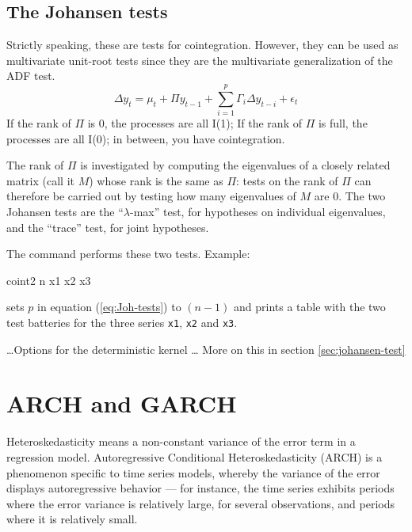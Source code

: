 \subsection{The Johansen tests}
\label{sec:Joh-test}

Strictly speaking, these are tests for cointegration. However, they
can be used as multivariate unit-root tests since they are the
multivariate generalization of the ADF test.
\begin{equation}
  \label{eq:Joh-tests}
  \Delta y_t = \mu_t + \Pi y_{t-1} + \sum_{i=1}^p \Gamma_i \Delta
  y_{t-i} + \epsilon_t
\end{equation}
If the rank of $\Pi$ is 0, the processes are all I(1); If the rank of
$\Pi$ is full, the processes are all I(0); in between, you have
cointegration.

The rank of $\Pi$ is investigated by computing the eigenvalues of a
closely related matrix (call it $M$) whose rank is the same as $\Pi$:
tests on the rank of $\Pi$ can therefore be carried out by testing how
many eigenvalues of $M$ are 0. The two Johansen tests are the
``$\lambda$-max'' test, for hypotheses on individual eigenvalues, and
the ``trace'' test, for joint hypotheses.

The  command  performs these two tests.
Example:
\begin{code}
  coint2 n x1 x2 x3
\end{code}
sets $p$ in equation (\ref{eq:Joh-tests}) to $(n-1)$ and prints a table
with the two test batteries for the three series \verb|x1|, \verb|x2|
and \verb|x3|.
 
\ldots Options for the deterministic kernel \ldots
More on this in section \ref{sec:johansen-test}

\section{ARCH and GARCH}
\label{sec:arch}

Heteroskedasticity means a non-constant variance of the error term in
a regression model.  Autoregressive Conditional Heteroskedasticity
(ARCH) is a phenomenon specific to time series models, whereby the
variance of the error displays autoregressive behavior --- for
instance, the time series exhibits periods where the error variance is
relatively large, for several observations, and periods where it is
relatively small.

